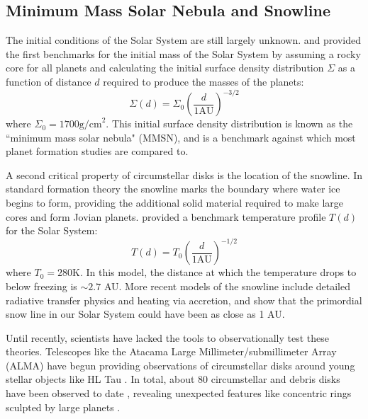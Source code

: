 \subsection{Minimum Mass Solar Nebula and Snowline}
The initial conditions of the Solar System are still largely unknown.
\citet{Hayashi1981} and \citet{Weidenschilling1977} provided the first benchmarks for the initial mass of the Solar System by assuming a rocky core for all planets and calculating the initial surface density distribution $\Sigma$ as a function of distance $d$ required to produce the masses of the planets:
\begin{equation}
\Sigma(d) = \Sigma_0\left(\frac{d}{1 \textrm{AU}} \right)^{-3/2}
\end{equation}
where $\Sigma_0 = 1700 \textrm{g/cm}^{2}$. 
This initial surface density distribution is known as the ``minimum mass solar nebula" (MMSN), and is a benchmark against which most planet formation studies are compared to.


A second critical property of circumstellar disks is the location of the snowline. 
In standard formation theory the snowline marks the boundary where water ice begins to form, providing the additional solid material required to make large cores and form Jovian planets.
\citet{Hayashi1981} provided a benchmark temperature profile $T(d)$ for the Solar System:
\begin{equation}
T(d) = T_0 \left(\frac{d}{1 \textrm{AU}} \right)^{-1/2}
\end{equation}
where $T_0 = 280$K. 
In this model, the distance at which the temperature drops to below freezing is $\sim 2.7$ AU. 
More recent models of the snowline \citep{Sasselov2000} include detailed radiative transfer physics and heating via accretion, and show that the primordial snow line in our Solar System could have been as close as 1 AU.

Until recently, scientists have lacked the tools to observationally test these theories.  
Telescopes like the Atacama Large Millimeter/submillimeter Array (ALMA) have begun providing observations of circumstellar disks around young stellar objects like HL Tau \citep{ALMA2015}.
In total, about 80 circumstellar and debris disks have been observed to date \citep[e.g.][]{Schneider2014,Choquet2016}, revealing unexpected features like concentric rings sculpted by large planets \citep{Tamayo2015}.

